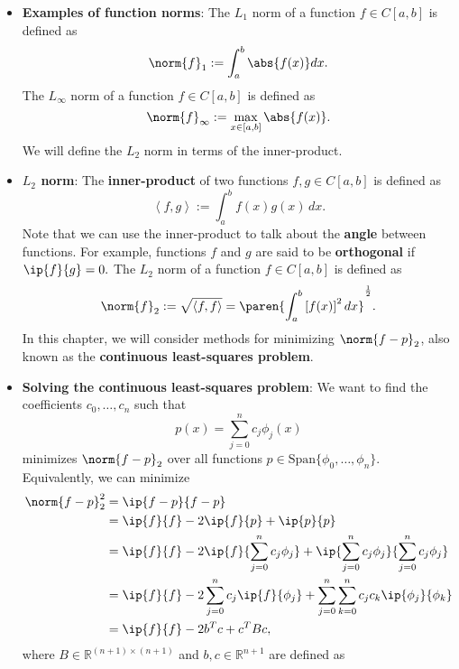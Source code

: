 \documentclass{report}
\begin{document}
\begin{itemize}
\begin{enumerate}
             \end{enumerate}
            \item \textbf{Examples of function norms}:
                The $L_1$ norm of a function $f \in C[a,b]$ is defined as
                $$\norm{f}_1 := \int_a^b \abs{f(x)} dx.$$
                The $L_\infty$ norm of a function $f \in C[a,b]$ is defined as
                $$\norm{f}_\infty := \max_{x \in [a,b]} \abs{f(x)}.$$
                We will define the $L_2$ norm in terms of the inner-product.
            \item \textbf{$L_{2}$ norm}:
                The \textbf{inner-product} of two functions $f,g \in C[a,b]$ is defined as 
                $$\left\langle f,g \right\rangle := \int_a^b f(x) g(x)\,dx.$$
                Note that we can use the inner-product to talk about the \textbf{angle} between functions. For example, functions $f$ and $g$ are said to be \textbf{orthogonal} if $\ip{f}{g} = 0.$
                \bigbreak \noindent 
                The $L_2$ norm of a function $f \in C[a,b]$ is defined as
                $$\norm{f}_2 := \sqrt{\left\langle f,f \right\rangle} = \paren{\int_a^b \left[f(x)\right]^2 dx}^{\frac{1}{2}}.$$
                In this chapter, we will consider methods for minimizing $\norm{f-p}_2$, also known as the \textbf{continuous least-squares problem}.
            \item \textbf{Solving the continuous least-squares problem}:
                We want to find the coefficients $c_0,\ldots,c_n$ such that 
                $$p(x) = \sum_{j=0}^n c_j \phi_j(x)$$
                minimizes $\norm{f-p}_2$ over all functions $p \in \text{Span}\{\phi_0,\ldots,\phi_n\}$.
                \bigbreak \noindent 
                Equivalently, we can minimize 
                \begin{align*}
                    \norm{f-p}_2^2 
& = \ip{f-p}{f-p} \\
& = \ip{f}{f} - 2\ip{f}{p} + \ip{p}{p} \\
& = \ip{f}{f} - 2\ip{f}{\sum_{j=0}^n c_j \phi_j} + \ip{\sum_{j=0}^n c_j \phi_j}{\sum_{j=0}^n c_j \phi_j} \\
& = \ip{f}{f} - 2\sum_{j=0}^n c_j \ip{f}{\phi_j} + \sum_{j=0}^n \sum_{k=0}^n c_j c_k \ip{\phi_j}{\phi_k} \\
& = \ip{f}{f} - 2b^Tc + c^T B c, \\
                \end{align*}
                where $B \in \mathbb{R}^{(n+1) \times (n+1)}$ and $b, c \in \mathbb{R}^{n+1}$ are defined as
                $$
$$
\end{itemize}
\end{document}
